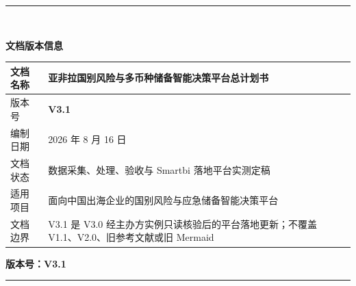 \documentclass[UTF8,fontset=windows,12pt,openany]{ctexbook}
\begin{document}
\clearpage
\thispagestyle{empty}
\begin{center}
  \vspace*{3.2cm}
  {\color{OceanBlue}\rule{0.82\textwidth}{1.4pt}}\\[1.2cm]
  {\Huge\bfseries\color{DeepNavy}文档版本信息\par}
  \vspace{1.4cm}
  \begin{tabular}{p{4.2cm}p{8.0cm}}
    \toprule
    文档名称 & 亚非拉国别风险与多币种储备智能决策平台总计划书\\
    \midrule
    版本号 & \textbf{V3.1}\\
    编制日期 & 2026 年 8 月 16 日\\
    文档状态 & 数据采集、处理、验收与 Smartbi 落地平台实测定稿\\
    适用项目 & 面向中国出海企业的国别风险与应急储备智能决策平台\\
    文档边界 & V3.1 是 V3.0 经主办方实例只读核验后的平台落地更新；不覆盖 V1.1、V2.0、旧参考文献或旧 Mermaid\\
    \bottomrule
  \end{tabular}
  \vfill
  {\Large\bfseries\color{DeepNavy}版本号：V3.1\par}
  \vspace{1.0cm}
  {\color{OceanBlue}\rule{0.82\textwidth}{1.4pt}}
\end{center}
\end{document}
